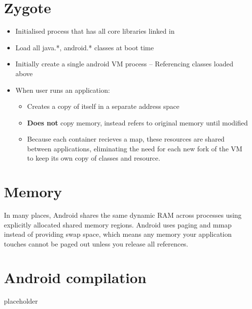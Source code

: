 \documentclass{article}
\begin{document}
\section{Zygote}
\begin{itemize}
  \item Initialised process that has all core libraries linked in
  \item Load all java.*, android.* classes at boot time
  \item Initially create a single android VM process – Referencing classes loaded above
  \item When user runs an application:
  \begin{itemize}
    \item Creates a copy of itself in a separate address space
    \item \textbf{Does not} copy memory, instead refers to original memory until modified
    \item Because each container recieves a map, these resources are shared between applications, eliminating the need for each new fork of the VM to keep its own copy of classes and resource.
  \end{itemize}
\end{itemize}

\section{Memory}
\begin{flushleft}
In many places, Android shares the same dynamic RAM across processes using explicitly allocated shared memory regions.
Android uses paging and mmap instead of providing swap space, which means any memory your application touches cannot be paged out unless you release all references.
\end{flushleft}

\section{Android compilation}

\newpage

\begin{description}
	\item[placeholder] \hfill \\
\end{description}
\end{document}
